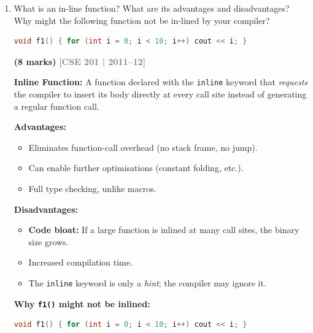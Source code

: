 \documentclass[12pt,a3paper]{article}
\newcommand{\yr}[1]{\hfill\textcolor{gray}{\small\textbf{[#1]}}}
\newcommand{\mk}[1]{\textcolor{orange!70!black}{\small\textbf{(#1 marks)}}}
\begin{document}
\begin{enumerate}
\begin{tcolorbox}[enhanced,breakable,ansbox,colback=cA!4,colframe=cA,
  boxrule=0.8pt,arc=5pt,
  title={\textbf{Answer}},fonttitle=\bfseries\color{white},colbacktitle=cA]
\end{tcolorbox}

\item What is an in-line function? What are its advantages and disadvantages? Why might the following function not be in-lined by your compiler?
\begin{lstlisting}[language=C++]
void f1() { for (int i = 0; i < 10; i++) cout << i; }
\end{lstlisting}
\mk{8}
\yr{CSE 201 | 2011--12}

\begin{tcolorbox}[enhanced,breakable,ansbox,colback=cA!4,colframe=cA,
  boxrule=0.8pt,arc=5pt,
  title={\textbf{Answer}},fonttitle=\bfseries\color{white},colbacktitle=cA]

\textbf{Inline Function:} A function declared with the \texttt{inline}
keyword that \emph{requests} the compiler to insert its body directly
at every call site instead of generating a regular function call.

\textbf{Advantages:}
\begin{itemize}[itemsep=2pt]
  \item Eliminates function-call overhead (no stack frame, no jump).
  \item Can enable further optimisations (constant folding, etc.).
  \item Full type checking, unlike macros.
\end{itemize}

\textbf{Disadvantages:}
\begin{itemize}[itemsep=2pt]
  \item \textbf{Code bloat:} If a large function is inlined at many
    call sites, the binary size grows.
  \item Increased compilation time.
  \item The \texttt{inline} keyword is only a \emph{hint}; the
    compiler may ignore it.
\end{itemize}

\medskip
\textbf{Why \texttt{f1()} might not be inlined:}

\begin{lstlisting}[language=C++]
void f1() { for (int i = 0; i < 10; i++) cout << i; }
\end{lstlisting}


\end{tcolorbox}
\end{enumerate}
\end{document}
